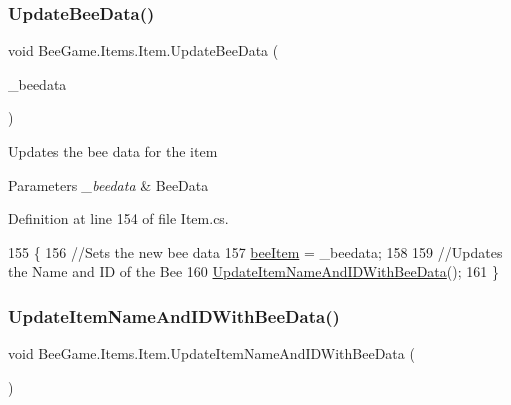 \subsubsection{\texorpdfstring{Update\+Bee\+Data()}{UpdateBeeData()}}
{\footnotesize\ttfamily void Bee\+Game.\+Items.\+Item.\+Update\+Bee\+Data (\begin{DoxyParamCaption}\item[{\hyperlink{struct_bee_game_1_1_bee_1_1_bee_data}{Bee\+Data}}]{\+\_\+beedata }\end{DoxyParamCaption})}



Updates the bee data for the item 


\begin{DoxyParams}{Parameters}
{\em \+\_\+beedata} & Bee\+Data\\
\hline
\end{DoxyParams}


Definition at line 154 of file Item.\+cs.


\begin{DoxyCode}
155         \{
156             \textcolor{comment}{//Sets the new bee data}
157             \hyperlink{struct_bee_game_1_1_items_1_1_item_a0593f3b7b3ff5daa864f3c6d0ccd77ca}{beeItem} = \_beedata;
158 
159             \textcolor{comment}{//Updates the Name and ID of the Bee}
160             \hyperlink{struct_bee_game_1_1_items_1_1_item_a6ceebb94663dc0cb54e048ec37fab3fa}{UpdateItemNameAndIDWithBeeData}();
161         \}
\end{DoxyCode}
\mbox{\label{struct_bee_game_1_1_items_1_1_item_a6ceebb94663dc0cb54e048ec37fab3fa}} 
\subsubsection{\texorpdfstring{Update\+Item\+Name\+And\+I\+D\+With\+Bee\+Data()}{UpdateItemNameAndIDWithBeeData()}}
{\footnotesize\ttfamily void Bee\+Game.\+Items.\+Item.\+Update\+Item\+Name\+And\+I\+D\+With\+Bee\+Data (\begin{DoxyParamCaption}{ }\end{DoxyParamCaption})}



